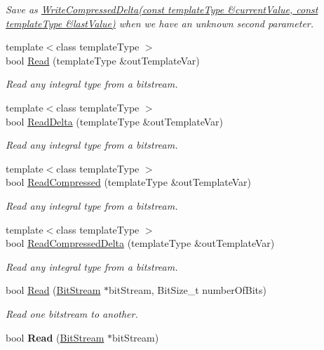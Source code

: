 \begin{DoxyCompactItemize}
\begin{DoxyCompactList}\small\item\em Save as \hyperlink{class_rak_net_1_1_bit_stream_a1f8aab299cf0eb021802ed8671844948}{Write\-Compressed\-Delta(const template\-Type \&current\-Value, const template\-Type \&last\-Value)} when we have an unknown second parameter. \end{DoxyCompactList}\item 
{\footnotesize template$<$class template\-Type $>$ }\\bool \hyperlink{class_rak_net_1_1_bit_stream_a865bd246780b10e2b9d7c1bc13044343}{Read} (template\-Type \&out\-Template\-Var)
\begin{DoxyCompactList}\small\item\em Read any integral type from a bitstream. \end{DoxyCompactList}\item 
{\footnotesize template$<$class template\-Type $>$ }\\bool \hyperlink{class_rak_net_1_1_bit_stream_ad19904647a86e54757a4a740d1275b00}{Read\-Delta} (template\-Type \&out\-Template\-Var)
\begin{DoxyCompactList}\small\item\em Read any integral type from a bitstream. \end{DoxyCompactList}\item 
{\footnotesize template$<$class template\-Type $>$ }\\bool \hyperlink{class_rak_net_1_1_bit_stream_acc394f439d9112328f92e7b22d116e5a}{Read\-Compressed} (template\-Type \&out\-Template\-Var)
\begin{DoxyCompactList}\small\item\em Read any integral type from a bitstream. \end{DoxyCompactList}\item 
{\footnotesize template$<$class template\-Type $>$ }\\bool \hyperlink{class_rak_net_1_1_bit_stream_a099c2c8fb1b5321aacb5bded88a8f300}{Read\-Compressed\-Delta} (template\-Type \&out\-Template\-Var)
\begin{DoxyCompactList}\small\item\em Read any integral type from a bitstream. \end{DoxyCompactList}\item 
bool \hyperlink{class_rak_net_1_1_bit_stream_a025f73d57a5ebe8fb6393eca5f3616df}{Read} (\hyperlink{class_rak_net_1_1_bit_stream}{Bit\-Stream} $\ast$bit\-Stream, Bit\-Size\-\_\-t number\-Of\-Bits)
\begin{DoxyCompactList}\small\item\em Read one bitstream to another. \end{DoxyCompactList}\item 
\hypertarget{class_rak_net_1_1_bit_stream_a3673034f3b7dfce9687b450762b50eaf}{bool {\bfseries Read} (\hyperlink{class_rak_net_1_1_bit_stream}{Bit\-Stream} $\ast$bit\-Stream)}\label{class_rak_net_1_1_bit_stream_a3673034f3b7dfce9687b450762b50eaf}


\end{DoxyCompactItemize}
